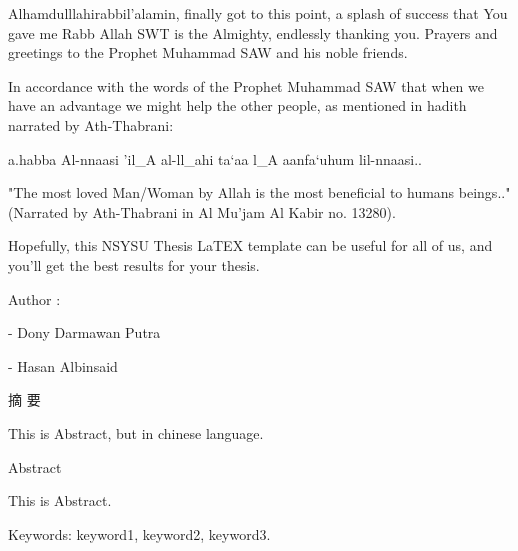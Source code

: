 \documentclass[12pt, twoside , openright]{book}
\begin{document}
Alhamdulllahirabbil'alamin, finally got to this point, a splash of success that You gave me Rabb Allah SWT is the Almighty, endlessly thanking you. Prayers and greetings to the Prophet Muhammad SAW and his noble friends.  

In accordance with the words of the Prophet Muhammad SAW that when we have an advantage we might help the other people, as mentioned in hadith narrated by Ath-Thabrani:

\begin{center}
	\begin{RLtext}
		a.habba Al-nnaasi 'il_A al-ll_ahi ta`aa l_A aanfa`uhum lil-nnaasi..
	\end{RLtext}
\end{center}


"The most loved Man/Woman by Allah is the most beneficial to humans  beings.." (Narrated by Ath-Thabrani in Al Mu'jam Al Kabir no. 13280).

Hopefully, this NSYSU Thesis LaTEX template can be useful for all of us, and you'll get the best results for your thesis.

\noindent
Author :

\vspace{-2em}
- Dony Darmawan Putra

\vspace{-2em}
- Hasan Albinsaid

\newpage
\mbox{}
\newpage





{}
\begin{center}
	{\chinnesesize 摘 要}
\end{center}
This is Abstract, but in chinese language. \blindtext[1]
\newpage
\mbox{}
\newpage





{}
\begin{center}
	{\chinnesesize Abstract}
\end{center}

This is Abstract. \blindtext[1]


\noindent Keywords: keyword1, keyword2, keyword3.
\newpage
\end{document}
